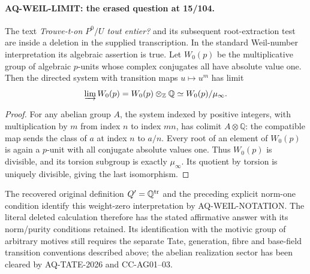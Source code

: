 \paragraph{AQ-WEIL-LIMIT: the erased question at 15/104.}
The text \emph{Trouve-t-on $P^0/U$ tout entier?}
and its subsequent root-extraction test are inside a
deletion in the supplied transcription. In the standard
Weil-number interpretation its algebraic assertion is true.
Let $W_0(p)$ be the multiplicative group of algebraic
$p$-units whose complex conjugates all have absolute
value one. Then the directed system with transition
maps $u\mapsto u^m$ has limit
\[
 \varinjlim W_0(p)=W_0(p)\otimes_{\mathbb Z}\mathbb Q
                 \simeq W_0(p)/\mu_\infty .
\]
\begin{proof}
For any abelian group $A$, the system indexed by
positive integers, with multiplication by $m$ from
index $n$ to index $mn$, has colimit
$A\otimes\mathbb Q$: the compatible map sends
the class of $a$ at index $n$ to $a/n$.
Every root of an element of $W_0(p)$ is again
a $p$-unit with all conjugate absolute values one.
Thus $W_0(p)$ is divisible, and its torsion subgroup
is exactly $\mu_\infty$. Its quotient by torsion
is uniquely divisible, giving the last isomorphism.
\end{proof}
The recovered original definition $Q'=\mathbb Q^{\rm tr}$
and the preceding explicit norm-one condition identify
this weight-zero interpretation by AQ-WEIL-NOTATION.
The literal deleted calculation therefore has the stated
affirmative answer with its norm/purity conditions retained.
Its identification with the motivic group of arbitrary
motives still requires the separate Tate, generation,
fibre and base-field transition conventions described above;
the abelian realization sector has been cleared by
AQ-TATE-2026 and CC-AG01--03.

